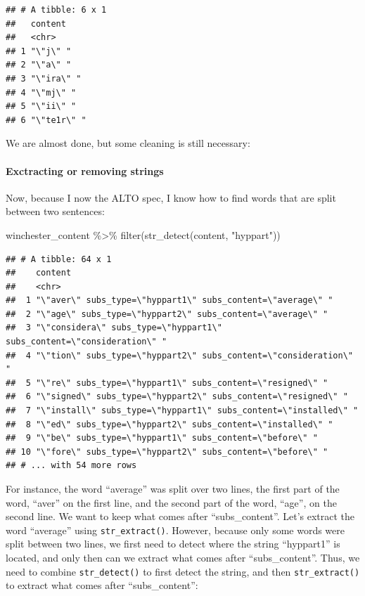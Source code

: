 \documentclass[
]{article}
\newenvironment{Shaded}{\begin{snugshade}}{\end{snugshade}}
\newcommand{\FunctionTok}[1]{\textcolor[rgb]{0.00,0.00,0.00}{#1}}
\newcommand{\NormalTok}[1]{#1}
\newcommand{\SpecialCharTok}[1]{\textcolor[rgb]{0.00,0.00,0.00}{#1}}
\newcommand{\StringTok}[1]{\textcolor[rgb]{0.31,0.60,0.02}{#1}}
\begin{document}
\begin{verbatim}
## # A tibble: 6 x 1
##   content    
##   <chr>      
## 1 "\"j\" "   
## 2 "\"a\" "   
## 3 "\"ira\" " 
## 4 "\"mj\" "  
## 5 "\"ii\" "  
## 6 "\"te1r\" "
\end{verbatim}

We are almost done, but some cleaning is still necessary:

\hypertarget{exctracting-or-removing-strings}{%
\paragraph{Exctracting or removing strings}\label{exctracting-or-removing-strings}}

Now, because I now the ALTO spec, I know how to find words that are split between two sentences:

\begin{Shaded}
\begin{Highlighting}[]
\NormalTok{winchester\_content }\SpecialCharTok{\%\textgreater{}\%} 
  \FunctionTok{filter}\NormalTok{(}\FunctionTok{str\_detect}\NormalTok{(content, }\StringTok{"hyppart"}\NormalTok{))}
\end{Highlighting}
\end{Shaded}

\begin{verbatim}
## # A tibble: 64 x 1
##    content                                                               
##    <chr>                                                                 
##  1 "\"aver\" subs_type=\"hyppart1\" subs_content=\"average\" "           
##  2 "\"age\" subs_type=\"hyppart2\" subs_content=\"average\" "            
##  3 "\"considera\" subs_type=\"hyppart1\" subs_content=\"consideration\" "
##  4 "\"tion\" subs_type=\"hyppart2\" subs_content=\"consideration\" "     
##  5 "\"re\" subs_type=\"hyppart1\" subs_content=\"resigned\" "            
##  6 "\"signed\" subs_type=\"hyppart2\" subs_content=\"resigned\" "        
##  7 "\"install\" subs_type=\"hyppart1\" subs_content=\"installed\" "      
##  8 "\"ed\" subs_type=\"hyppart2\" subs_content=\"installed\" "           
##  9 "\"be\" subs_type=\"hyppart1\" subs_content=\"before\" "              
## 10 "\"fore\" subs_type=\"hyppart2\" subs_content=\"before\" "            
## # ... with 54 more rows
\end{verbatim}

For instance, the word ``average'' was split over two lines, the first part of the word, ``aver'' on the
first line, and the second part of the word, ``age'', on the second line. We want to keep what comes
after ``subs\_content''. Let's extract the word ``average'' using \texttt{str\_extract()}. However, because only
some words were split between two lines, we first need to detect where the string ``hyppart1'' is
located, and only then can we extract what comes after ``subs\_content''. Thus, we need to combine
\texttt{str\_detect()} to first detect the string, and then \texttt{str\_extract()} to extract what comes after
``subs\_content'':
\end{document}
